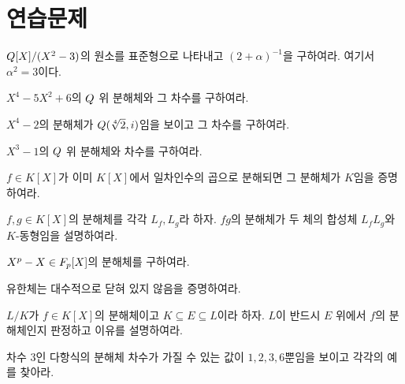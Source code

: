 \section{연습문제}

\begin{exercise}
$Q[X]/(X^2-3)$의 원소를 표준형으로 나타내고 $(2+\alpha)^{-1}$을 구하여라. 여기서 $\alpha^2=3$이다.
\end{exercise}

\begin{exercise}
$X^4-5X^2+6$의 $Q$ 위 분해체와 그 차수를 구하여라.
\end{exercise}

\begin{exercise}
$X^4-2$의 분해체가 $Q(\sqrt[4]{2},i)$임을 보이고 그 차수를 구하여라.
\end{exercise}

\begin{exercise}
$X^3-1$의 $Q$ 위 분해체와 차수를 구하여라.
\end{exercise}

\begin{exercise}
$f\in K[X]$가 이미 $K[X]$에서 일차인수의 곱으로 분해되면 그 분해체가 $K$임을 증명하여라.
\end{exercise}

\begin{exercise}
$f,g\in K[X]$의 분해체를 각각 $L_f,L_g$라 하자. $fg$의 분해체가 두 체의 합성체 $L_fL_g$와 $K$-동형임을 설명하여라.
\end{exercise}

\begin{exercise}
$X^p-X\in F_p[X]$의 분해체를 구하여라.
\end{exercise}

\begin{exercise}
유한체는 대수적으로 닫혀 있지 않음을 증명하여라.
\end{exercise}

\begin{exercise}
$L/K$가 $f\in K[X]$의 분해체이고 $K\subseteq E\subseteq L$이라 하자. $L$이 반드시 $E$ 위에서 $f$의 분해체인지 판정하고 이유를 설명하여라.
\end{exercise}

\begin{exercise}
차수 $3$인 다항식의 분해체 차수가 가질 수 있는 값이 $1,2,3,6$뿐임을 보이고 각각의 예를 찾아라.
\end{exercise}
